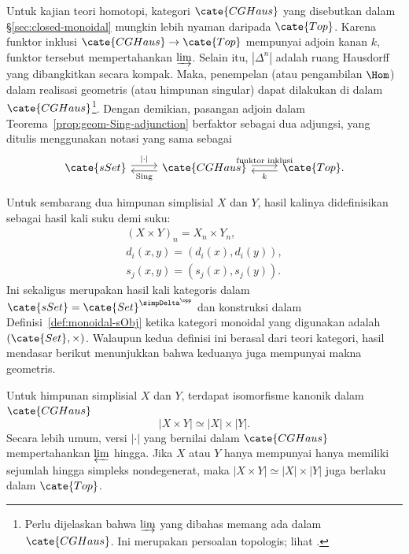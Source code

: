 \begin{remark}
	Untuk kajian teori homotopi, kategori $\cate{CGHaus}$ yang disebutkan dalam
	\S\ref{sec:closed-monoidal} mungkin lebih nyaman daripada $\cate{Top}$.
	Karena funktor inklusi $\cate{CGHaus}\to\cate{Top}$ mempunyai adjoin kanan
	$k$, funktor tersebut mempertahankan $\varinjlim$. Selain itu,
	$|\Delta^n|$ adalah ruang Hausdorff yang dibangkitkan secara kompak. Maka,
	penempelan (atau pengambilan $\Hom$) dalam realisasi geometris (atau
	himpunan singular) dapat dilakukan di dalam $\cate{CGHaus}$\footnote{Perlu
	dijelaskan bahwa $\varinjlim$ yang dibahas memang ada dalam
	$\cate{CGHaus}$. Ini merupakan persoalan topologis; lihat
	\cite[III.1.8, III.2.1]{GZ67}.}. Dengan demikian, pasangan adjoin dalam
	Teorema~\ref{prop:geom-Sing-adjunction} berfaktor sebagai dua adjungsi, yang
	ditulis menggunakan notasi yang sama sebagai
	\[\begin{tikzcd}
		\cate{sSet} \arrow[shift left, r, "{|\cdot|}"] & \cate{CGHaus} \arrow[shift left, r, "\text{funktor inklusi}"] \arrow[shift left, l, "\mathrm{Sing}"] & \cate{Top} \arrow[shift left, l, "k"] .
	\end{tikzcd}\]
\end{remark}

Untuk sembarang dua himpunan simplisial $X$ dan $Y$, hasil kalinya
didefinisikan sebagai hasil kali suku demi suku:
\begin{gather*}
	(X \times Y)_n = X_n \times Y_n, \\
	d_i(x, y) = (d_i(x), d_i(y)), \\
	s_j(x, y) = (s_j(x), s_j(y)).
\end{gather*}
Ini sekaligus merupakan hasil kali kategoris dalam
$\cate{sSet}=\cate{Set}^{\simpDelta^{\opp}}$ dan konstruksi dalam
Definisi~\ref{def:monoidal-sObj} ketika kategori monoidal yang digunakan
adalah $(\cate{Set},\times)$. Walaupun kedua definisi ini berasal dari teori
kategori, hasil mendasar berikut menunjukkan bahwa keduanya juga mempunyai
makna geometris.

\begin{theorem}\label{prop:realization-product}
	Untuk himpunan simplisial $X$ dan $Y$, terdapat isomorfisme kanonik dalam
	$\cate{CGHaus}$
	\[ |X \times Y| \simeq |X| \times |Y|. \]
	Secara lebih umum, versi $|\cdot|$ yang bernilai dalam $\cate{CGHaus}$
	mempertahankan $\varprojlim$ hingga. Jika $X$ atau $Y$ hanya mempunyai
	hanya memiliki sejumlah hingga simpleks nondegenerat, maka
	$|X\times Y|\simeq|X|\times|Y|$ juga berlaku dalam $\cate{Top}$.
\end{theorem}

